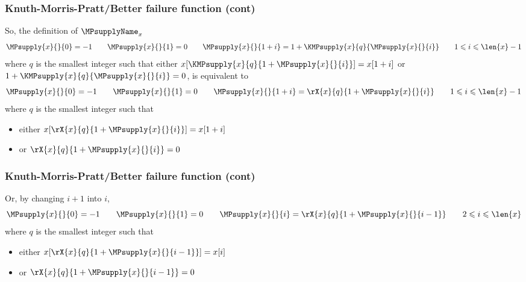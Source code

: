 %
\begin{frame}
\frametitle{Knuth-Morris-Pratt/Better failure function (cont)}

So, the definition of \(\MPsupplyName_{x}\)
\[
\MPsupply{x}{}{0} = -1
\qquad
\MPsupply{x}{}{1} = 0
\qquad
\MPsupply{x}{}{1+i} = 1 + \KMPsupply{x}{q}{\MPsupply{x}{}{i}}
\qquad 1 \leqslant i \leqslant \len{x} - 1
\]
where \(q\) is the smallest integer such that either
\(x[\KMPsupply{x}{q}{1 + \MPsupply{x}{}{i}}]=x[1+i]\) or
\(1+\KMPsupply{x}{q}{\MPsupply{x}{}{i}} = 0\), is equivalent to
\[
\MPsupply{x}{}{0} = -1
\qquad
\MPsupply{x}{}{1} = 0
\qquad
\MPsupply{x}{}{1+i} = \rX{x}{q}{1 + \MPsupply{x}{}{i}}
\qquad 1 \leqslant i \leqslant \len{x} - 1
\]
where \(q\) is the smallest integer such that
\begin{itemize}

  \item either \(x[\rX{x}{q}{1 + \MPsupply{x}{}{i}}]=x[1+i]\)
  
  \item or \(\rX{x}{q}{1 + \MPsupply{x}{}{i}} = 0\)

\end{itemize}

\end{frame}

%
\begin{frame}
\frametitle{Knuth-Morris-Pratt/Better failure function (cont)}

Or, by changing \(i+1\) into \(i\),
\[
\MPsupply{x}{}{0} = -1
\qquad
\MPsupply{x}{}{1} = 0
\qquad
\MPsupply{x}{}{i} = \rX{x}{q}{1 + \MPsupply{x}{}{i-1}}
\qquad 2 \leqslant i \leqslant \len{x}
\]
where \(q\) is the smallest integer such that
\begin{itemize}

  \item either \(x[\rX{x}{q}{1 + \MPsupply{x}{}{i-1}}]=x[i]\)
  
  \item or \(\rX{x}{q}{1 + \MPsupply{x}{}{i-1}} = 0\)

\end{itemize}

\end{frame}

